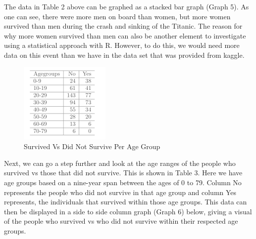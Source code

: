 \documentclass[sigconf]{acmart}
\begin{document}
The data in Table 2 above can be graphed as a stacked bar graph (Graph 5). As one can see, there were more men on board than women, but more women survived than men during the crash and sinking of the Titanic. The reason for why more women survived than men can also be another element to investigate using a statistical approach with R. However, to do this, we would need more data on this event than we have in the data set that was provided from kaggle. 

\begin{figure}[htb]
  \centering
  \includegraphics[width=1.0\columnwidth]{paper2/Table 3.png}
  \caption{Survived Vs Did Not Survive Per Age Group
  \cite{Tibenkana and Driscoll, Data Set from Kaggle}}
  \label{fig:Table 3} 
\end{figure}

Next, we can go a step further and look at the age ranges of the people who survived vs those that did not survive. This is shown in Table 3. Here we have age groups based on a nine-year span between the ages of 0 to 79. Column No represents the people who did not survive in that age group and column Yes represents, the individuals that survived within those age groups. This data can then be displayed in a side to side column graph (Graph 6) below, giving a visual of the people who survived vs who did not survive within their respected age groups.
\end{document}
